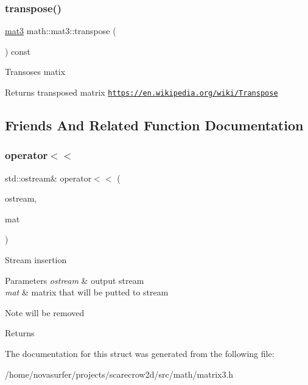 \subsubsection{\texorpdfstring{transpose()}{transpose()}}
{\footnotesize\ttfamily \hyperlink{structmath_1_1mat3}{mat3} math\+::mat3\+::transpose (\begin{DoxyParamCaption}{ }\end{DoxyParamCaption}) const\hspace{0.3cm}{\ttfamily [inline]}}

Transoses matix \begin{DoxyReturn}{Returns}
transposed matrix  \href{https://en.wikipedia.org/wiki/Transpose}{\tt https\+://en.\+wikipedia.\+org/wiki/\+Transpose} 
\end{DoxyReturn}


\subsection{Friends And Related Function Documentation}
\mbox{\label{structmath_1_1mat3_a1c28931c2fc172608795255611dea691}} 
\subsubsection{\texorpdfstring{operator$<$$<$}{operator<<}}
{\footnotesize\ttfamily std\+::ostream\& operator$<$$<$ (\begin{DoxyParamCaption}\item[{std\+::ostream \&}]{ostream,  }\item[{const \hyperlink{structmath_1_1mat3}{mat3} \&}]{mat }\end{DoxyParamCaption})\hspace{0.3cm}{\ttfamily [friend]}}

Stream insertion 
\begin{DoxyParams}{Parameters}
{\em ostream} & output stream \\
\hline
{\em mat} & matrix that will be putted to stream \\
\hline
\end{DoxyParams}
\begin{DoxyNote}{Note}
will be removed 
\end{DoxyNote}
\begin{DoxyReturn}{Returns}

\end{DoxyReturn}


The documentation for this struct was generated from the following file\+:\begin{DoxyCompactItemize}
\item 
/home/novasurfer/projects/scarecrow2d/src/math/matrix3.\+h\end{DoxyCompactItemize}
